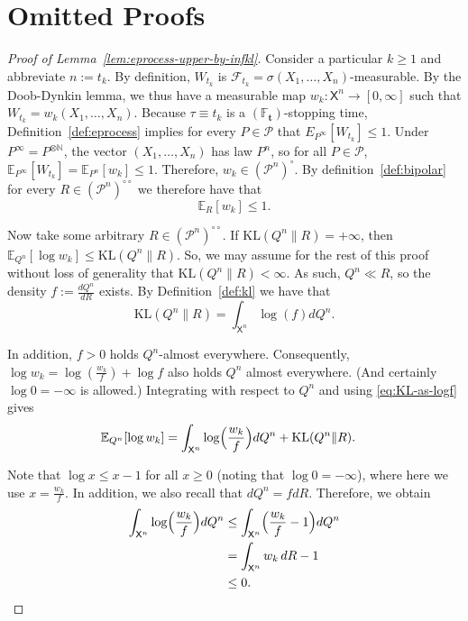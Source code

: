 \documentclass[11pt]{article}
\newcommand{\KL}{\mathrm{KL}}
\newcommand{\E}{\mathbb{E}}
\newcommand{\Pcal}{\mathcal{P}}
\newcommand{\X}{\mathsf{X}}
\newcommand{\bbF}{\mathbb F}
\newcommand{\bt}{\mathbf t}
\theoremstyle{definition}
\theoremstyle{definition}
\begin{document}
\printbibliography

\appendix


\section{Omitted Proofs}\label{sec:proofs-apendix}
\begin{proof}[Proof of Lemma~\ref{lem:eprocess-upper-by-infkl}]
Consider a particular $k\ge 1$ and abbreviate $n:=t_k$. By definition, $W_{t_k}$ is $\mathcal F_{t_k}=\sigma(X_1,\dots,X_n)$-measurable. By the Doob-Dynkin lemma, we thus have a measurable map $w_k:\X^{n}\to[0,\infty]$ such that $W_{t_k}=w_k(X_1,\dots,X_n)$. Because $\tau\equiv t_k$ is a $(\bbF_{\bt})$-stopping time, Definition~\ref{def:eprocess} implies for every $P\in\Pcal$ that $E_{P^\infty}[W_{t_k}]\le 1$. Under $P^\infty=P^{\otimes\mathbb N}$, the vector $(X_1,\dots,X_n)$ has law $P^n$, so for all $P\in\Pcal$, $\E_{P^\infty}[W_{t_k}]=\E_{P^n}[w_k]\le 1$. Therefore, $w_k\in(\Pcal^n)^\circ$. By definition~\ref{def:bipolar} for every $R\in(\Pcal^n)^{\circ\circ}$ we therefore have that
\begin{equation}\label{eq:ERwk}
\E_R[w_k]\le 1.    
\end{equation}

Now take some arbitrary $R\in(\Pcal^n)^{\circ\circ}$. If $\KL(Q^n\|R)=+\infty$, then $\E_{Q^n}[\log w_k]\le \KL(Q^n\|R)$. So, we may assume for the rest of this proof without loss of generality that $\KL(Q^n\|R)<\infty$. As such, $Q^n\ll R$, so the density $f:=\frac{dQ^n}{dR}$ exists. By Definition~\ref{def:kl} we have that
\begin{equation}\label{eq:KL-as-logf}
\KL(Q^n\|R)=\int_{\X^n}\log(f)dQ^n.   
\end{equation}

In addition, $f>0$ holds $Q^n$-almost everywhere. Consequently, $\log w_k=\log(\frac{w_k}{f})+\log f$ also holds $Q^n$ almost everywhere. (And certainly $\log 0=-\infty$ is allowed.) Integrating with respect to $Q^n$ and using \eqref{eq:KL-as-logf} gives
\begin{align}
\E_{Q^n}[\log w_k]&=\int_{\X^n}\log\Bigl(\frac{w_k}{f}\Bigr)dQ^n + \KL(Q^n\|R).
\label{eq:split}
\end{align}

Note that $\log x\le x-1$ for all $x\ge 0$ (noting that $\log 0=-\infty$), where here we use $x=\frac{w_k}{f}$. In addition, we also recall that $dQ^n=fdR$. Therefore, we obtain
\begin{align}
\int_{\X^n}\log\Bigl(\frac{w_k}{f}\Bigr)dQ^n &\le \int_{\X^n}\Bigl(\frac{w_k}{f}-1\Bigr)dQ^n \nonumber\\
&= \int_{\X^n} w_k\,dR-1 \nonumber\\ 
&\le 0  
\label{eq:log-bound}.
\end{align}


\end{proof}
\end{document}
